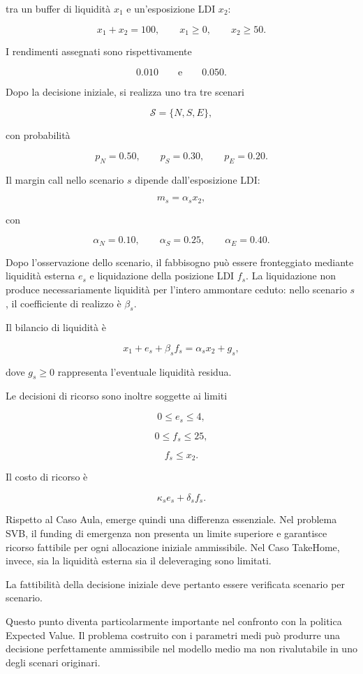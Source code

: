 \noindent tra un buffer di liquidit\`a \(x_1\) e un'esposizione LDI \(x_2\):

\[
x_1+x_2=100,
\qquad
x_1\geq 0,
\qquad
x_2\geq 50.
\]

I rendimenti assegnati sono rispettivamente

\[
0.010
\qquad\text{e}\qquad
0.050.
\]

Dopo la decisione iniziale, si realizza uno tra tre scenari

\[
\mathcal{S}
=
\{N,S,E\},
\]

\noindent con probabilit\`a

\[
p_N=0.50,
\qquad
p_S=0.30,
\qquad
p_E=0.20.
\]

Il margin call nello scenario \(s\) dipende dall'esposizione LDI:

\[
m_s
=
\alpha_s x_2,
\]

\noindent con

\[
\alpha_N=0.10,
\qquad
\alpha_S=0.25,
\qquad
\alpha_E=0.40.
\]

Dopo l'osservazione dello scenario, il fabbisogno pu\`o essere fronteggiato
mediante liquidit\`a esterna \(e_s\) e liquidazione della posizione LDI
\(f_s\). La liquidazione non produce necessariamente liquidit\`a per l'intero
ammontare ceduto: nello scenario \(s\), il coefficiente di realizzo \`e
\(\beta_s\).

Il bilancio di liquidit\`a \`e

\[
x_1
+
e_s
+
\beta_s f_s
=
\alpha_s x_2
+
g_s,
\]

\noindent dove \(g_s\geq 0\) rappresenta l'eventuale liquidit\`a residua.

Le decisioni di ricorso sono inoltre soggette ai limiti

\[
0\leq e_s\leq 4,
\]

\[
0\leq f_s\leq 25,
\]

\[
f_s\leq x_2.
\]


Il costo di ricorso \`{e}

\[
\kappa_s e_s
+
\delta_s f_s.
\]


Rispetto al Caso Aula, emerge quindi una differenza essenziale. Nel problema
SVB, il funding di emergenza non presenta un limite superiore e garantisce
ricorso fattibile per ogni allocazione iniziale ammissibile. Nel Caso
TakeHome, invece, sia la liquidit\`a esterna sia il deleveraging sono
limitati.

La fattibilit\`a della decisione iniziale deve pertanto essere verificata
scenario per scenario.

Questo punto diventa particolarmente importante nel confronto con la politica
Expected Value. Il problema costruito con i parametri medi pu\`o produrre una
decisione perfettamente ammissibile nel modello medio ma non rivalutabile in
uno degli scenari originari.

